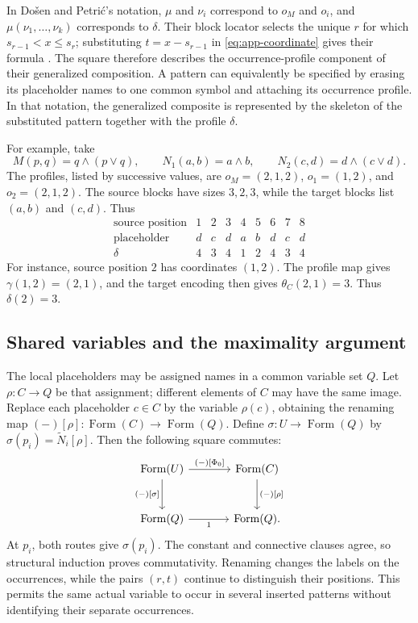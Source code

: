 \documentclass[11pt]{article}
\newcommand{\FormulaSet}{\operatorname{Form}}
\begin{document}
In Do\v{s}en and Petri\'c's notation, $\mu$ and $\nu_i$ correspond to
$o_M$ and $o_i$, and $\mu(\nu_1,\ldots,\nu_k)$ corresponds to $\delta$.
Their block locator selects the unique $r$ for which
$s_{r-1}<x\leq s_r$; substituting $t=x-s_{r-1}$ in
\eqref{eq:app-coordinate} gives their formula
\cite[\S2.5, p.~46]{DP}. The square therefore describes the
occurrence-profile component of their generalized composition.
A pattern can equivalently be specified by erasing its placeholder names to one common symbol and
attaching its occurrence profile. In that notation, the generalized
composite is represented by the skeleton of the substituted pattern
together with the profile $\delta$.

For example, take
\[
 M(p,q)=q\wedge(p\vee q),\qquad
 N_1(a,b)=a\wedge b,\qquad
 N_2(c,d)=d\wedge(c\vee d).
\]
The profiles, listed by successive values, are
$o_M=(2,1,2)$, $o_1=(1,2)$, and $o_2=(2,1,2)$.
The source blocks have sizes $3,2,3$, while the target blocks list
$(a,b)$ and $(c,d)$. Thus
\[
\begin{array}{c|ccc|cc|ccc}
 \text{source position}&1&2&3&4&5&6&7&8\\\hline
 \text{placeholder}&d&c&d&a&b&d&c&d\\
 \delta&4&3&4&1&2&4&3&4
\end{array}
\]
For instance, source position $2$ has coordinates $(1,2)$.
The profile map gives $\gamma(1,2)=(2,1)$, and the target encoding
then gives $\theta_C(2,1)=3$. Thus $\delta(2)=3$.

\subsection{Shared variables and the maximality argument}\label{app:shared}

The local placeholders may be assigned names in a common variable
set $Q$. Let $\rho:C\to Q$ be that assignment; different elements
of $C$ may have the same image. Replace each placeholder $c\in C$
by the variable $\rho(c)$, obtaining the renaming map
$(-)[\rho]:\FormulaSet(C)\to\FormulaSet(Q)$. Define
$\sigma:U\to\FormulaSet(Q)$ by
$\sigma(p_i)=\widetilde N_i[\rho]$.
Then the following square commutes:
\begin{equation}\label{eq:app-renaming}
\begin{tikzcd}[column sep=large,row sep=large]
 \FormulaSet(U)\arrow[r,"{(-)[\Phi_0]}"]
    \arrow[d,"{(-)[\sigma]}"']
   &\FormulaSet(C)\arrow[d,"{(-)[\rho]}"]\\
 \FormulaSet(Q)\arrow[r,"1"']&\FormulaSet(Q).
\end{tikzcd}
\end{equation}
At $p_i$, both routes give $\sigma(p_i)$. The constant and connective
clauses agree, so structural induction proves commutativity.
Renaming changes the labels on the occurrences, while the pairs
$(r,t)$ continue to distinguish their positions. This permits the
same actual variable to occur in several inserted patterns without
identifying their separate occurrences.
\end{document}
